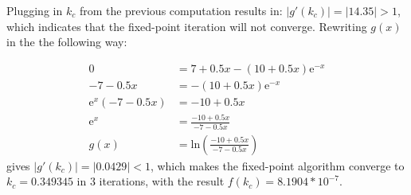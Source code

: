 \documentclass{article}
\begin{document}
  \noindent
  Plugging in $k_c$ from the previous computation results in:  $|g'(k_c)| = |14.35|
  > 1 $, which indicates that the fixed-point iteration will not converge.
  Rewriting $g(x)$ in the the following way:

  \noindent
  \begin{align*}
    0  &= 7 + 0.5x - (10 + 0.5x)\mathrm{e}^{-x} \\
    -7 -0.5x  &= -(10 + 0.5x)\mathrm{e}^{-x} \\
    \mathrm{e}^{x}(-7 -0.5x)  &= -10 + 0.5x \\
    \mathrm{e}^{x}  &= \frac{-10 + 0.5x}{-7-0.5x} \\
    g(x) &= \mathrm{ln}(\frac{-10 + 0.5x}{-7-0.5x})
  \end{align*}
  \noindent
  gives $|g'(k_c)| = |0.0429| < 1 $, which makes the fixed-point algorithm converge to
  $ k_c = 0.349345 $ in 3 iterations, with the result $f(k_c) = 8.1904*10^{-7}$.
\end{document}
